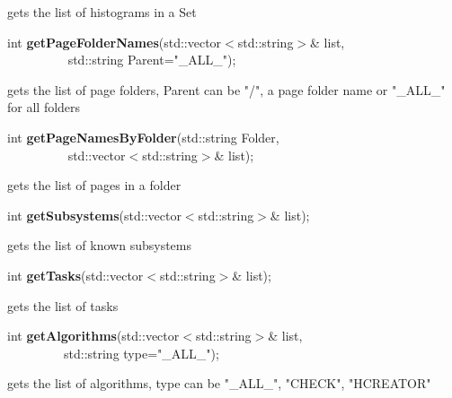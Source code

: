  gets the list of histograms in a Set


\item    int {\bf getPageFolderNames}(std::vector$<$std::string$>$\& list,\\\mbox{}~~~~~~~~~ std::string Parent="\_ALL\_");


 gets the list of page folders, Parent can be "/", a page folder name or "\_ALL\_" for all folders  


\item    int {\bf getPageNamesByFolder}(std::string Folder,\\\mbox{}~~~~~~~~~
			   std::vector$<$std::string$>$\& list);

 gets the list of pages in a folder


\item    int {\bf getSubsystems}(std::vector$<$std::string$>$\& list);


 gets the list of known subsystems


\item    int {\bf getTasks}(std::vector$<$std::string$>$\& list);


 gets the list of tasks


\item    int {\bf getAlgorithms}(std::vector$<$std::string$>$\& list,\\\mbox{}~~~~~~~~~std::string type="\_ALL\_");


 gets the list of algorithms, type can be "\_ALL\_", "CHECK", "HCREATOR"


